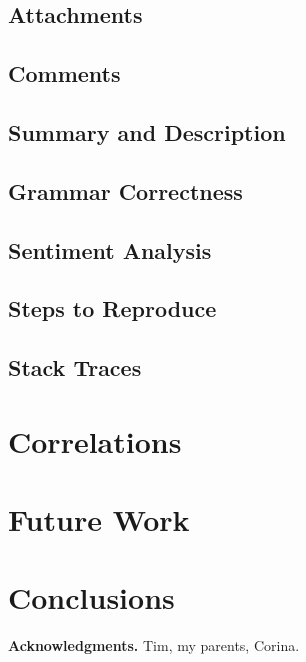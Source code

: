 \documentclass{mpaper}
\begin{document}
\subsection{Attachments}

\subsection{Comments}

\subsection{Summary and Description}

\subsection{Grammar Correctness}

\subsection{Sentiment Analysis}

\subsection{Steps to Reproduce}

\subsection{Stack Traces}

\section{Correlations}

\section{Future Work}

\section{Conclusions}

\vskip8pt \noindent
{\bf Acknowledgments.}
Tim, my parents, Corina.



\end{document}
